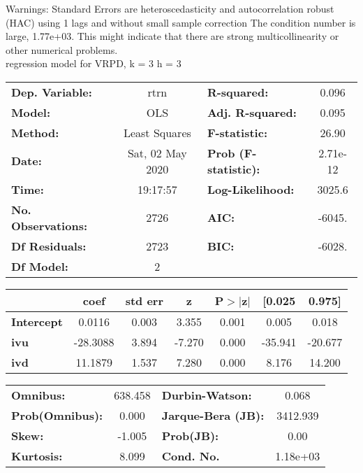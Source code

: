 Warnings: \newline
 [1] Standard Errors are heteroscedasticity and autocorrelation robust (HAC) using 1 lags and without small sample correction \newline
 [2] The condition number is large, 1.77e+03. This might indicate that there are \newline
 strong multicollinearity or other numerical problems.\\ 

regression model for VRPD, k = 3 h = 3\begin{center}
\begin{tabular}{lclc}
\toprule
\textbf{Dep. Variable:}    &       rtrn       & \textbf{  R-squared:         } &     0.096   \\
\textbf{Model:}            &       OLS        & \textbf{  Adj. R-squared:    } &     0.095   \\
\textbf{Method:}           &  Least Squares   & \textbf{  F-statistic:       } &     26.90   \\
\textbf{Date:}             & Sat, 02 May 2020 & \textbf{  Prob (F-statistic):} &  2.71e-12   \\
\textbf{Time:}             &     19:17:57     & \textbf{  Log-Likelihood:    } &    3025.6   \\
\textbf{No. Observations:} &        2726      & \textbf{  AIC:               } &    -6045.   \\
\textbf{Df Residuals:}     &        2723      & \textbf{  BIC:               } &    -6028.   \\
\textbf{Df Model:}         &           2      & \textbf{                     } &             \\
\bottomrule
\end{tabular}
\begin{tabular}{lcccccc}
                   & \textbf{coef} & \textbf{std err} & \textbf{z} & \textbf{P$> |$z$|$} & \textbf{[0.025} & \textbf{0.975]}  \\
\midrule
\textbf{Intercept} &       0.0116  &        0.003     &     3.355  &         0.001        &        0.005    &        0.018     \\
\textbf{ivu}       &     -28.3088  &        3.894     &    -7.270  &         0.000        &      -35.941    &      -20.677     \\
\textbf{ivd}       &      11.1879  &        1.537     &     7.280  &         0.000        &        8.176    &       14.200     \\
\bottomrule
\end{tabular}
\begin{tabular}{lclc}
\textbf{Omnibus:}       & 638.458 & \textbf{  Durbin-Watson:     } &    0.068  \\
\textbf{Prob(Omnibus):} &   0.000 & \textbf{  Jarque-Bera (JB):  } & 3412.939  \\
\textbf{Skew:}          &  -1.005 & \textbf{  Prob(JB):          } &     0.00  \\
\textbf{Kurtosis:}      &   8.099 & \textbf{  Cond. No.          } & 1.18e+03  \\
\bottomrule
\end{tabular}
\end{center}

